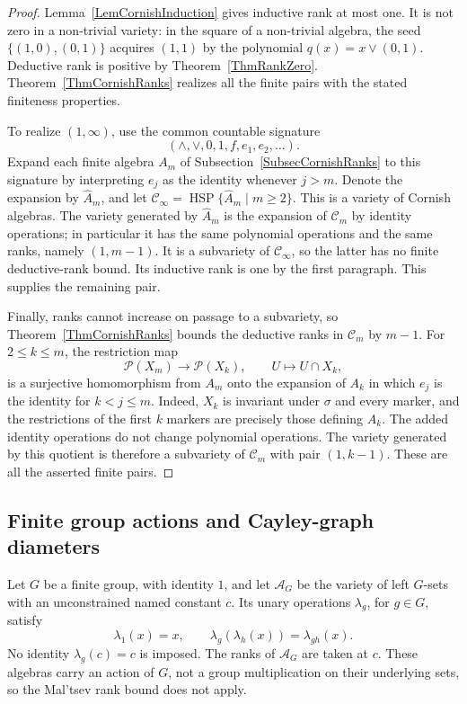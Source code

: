 \documentclass[12pt,english]{amsart}
\theoremstyle{definition}
\numberwithin{equation}{section}
\theoremstyle{remark}
\begin{document}
\begin{proof}
Lemma~\ref{LemCornishInduction} gives inductive rank at most one.
It is not zero in a non-trivial variety: in the square of a non-trivial
algebra, the seed $\{(1,0),(0,1)\}$ acquires $(1,1)$ by the polynomial
$q(x)=x\vee(0,1)$. Deductive rank is positive by
Theorem~\ref{ThmRankZero}. Theorem~\ref{ThmCornishRanks} realizes all
the finite pairs with the stated finiteness properties.

To realize $(1,\infty)$, use the common countable signature
\[
(\wedge,\vee,0,1,f,e_1,e_2,\ldots).
\]
Expand each finite algebra $A_m$ of
Subsection~\ref{SubsecCornishRanks} to this signature by interpreting
$e_j$ as the identity whenever $j>m$. Denote the expansion by
$\widehat A_m$, and let
$\mathcal C_\infty=\operatorname{HSP}\{\widehat A_m\mid m\geqslant2\}$.
This is a variety of Cornish algebras. The variety generated by
$\widehat A_m$ is the expansion of $\mathcal C_m$ by identity
operations; in particular it has the same polynomial operations and
the same ranks, namely $(1,m-1)$. It is a subvariety of
$\mathcal C_\infty$, so the latter has no finite deductive-rank bound.
Its inductive rank is one by the first paragraph. This supplies the
remaining pair.

Finally, ranks cannot increase on passage to a subvariety, so
Theorem~\ref{ThmCornishRanks} bounds the deductive ranks in
$\mathcal C_m$ by $m-1$. For $2\leqslant k\leqslant m$, the restriction
map
\[
\mathcal P(X_m)\longrightarrow\mathcal P(X_k),\qquad
U\longmapsto U\cap X_k,
\]
is a surjective homomorphism from $A_m$ onto the expansion of $A_k$
in which $e_j$ is the identity for $k<j\leqslant m$. Indeed, $X_k$
is invariant under $\sigma$ and every marker, and the restrictions of
the first $k$ markers are precisely those defining $A_k$. The added
identity operations do not change polynomial operations. The variety
generated by this quotient is therefore a subvariety of $\mathcal C_m$
with pair $(1,k-1)$. These are all the asserted finite pairs.
\end{proof}


\subsection{Finite group actions and Cayley-graph diameters}\label{SubsecGroupActions}

Let $G$ be a finite group, with identity $1$, and let $\mathcal A_G$
be the variety of left $G$-sets with an unconstrained named constant
$c$. Its unary operations $\lambda_g$, for $g\in G$, satisfy
\[
\lambda_1(x)=x,\qquad
\lambda_g(\lambda_h(x))=\lambda_{gh}(x).
\]
No identity $\lambda_g(c)=c$ is imposed. The ranks of $\mathcal A_G$
are taken at $c$. These algebras carry an action of $G$, not a group
multiplication on their underlying sets, so the Mal'tsev rank bound
does not apply.
\end{document}
